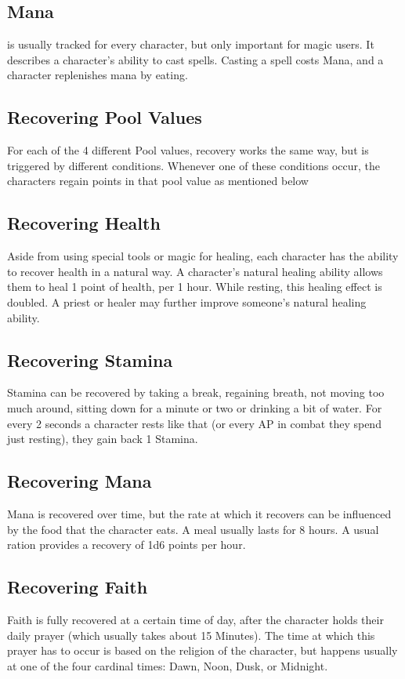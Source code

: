 \subsection{Mana}\label{pool:mana} is usually tracked for every character, but only important for magic users.
It describes a character's ability to cast spells.
Casting a spell costs Mana, and a character replenishes mana by eating.

\subsection{Recovering Pool Values}\label{subsec:recoveringPoolValues}
For each of the 4 different Pool values, recovery works the same way, but is triggered by different conditions.
Whenever one of these conditions occur, the characters regain points in that pool value as mentioned below

\subsection{Recovering Health}\label{subsec:recoverHealth}
Aside from using special tools or magic for healing, each character has the ability to recover health in a natural way.
A character's natural healing ability allows them to heal 1 point of health, per 1 hour.
While resting, this healing effect is doubled.
A priest or healer may further improve someone's natural healing ability.

\subsection{Recovering Stamina}\label{subsec:recoverStamina}
Stamina can be recovered by taking a break, regaining breath, not moving too much around, sitting down for a minute or two or drinking a bit of water.
For every 2 seconds a character rests like that (or every AP in combat they spend just resting), they gain back 1 Stamina.

\subsection{Recovering Mana}\label{subsec:recoverMana}
Mana is recovered over time, but the rate at which it recovers can be influenced by the food that the character eats.
A meal usually lasts for 8 hours.
A usual ration provides a recovery of 1d6 points per hour.

\subsection{Recovering Faith}\label{subsec:recoverFaith}
Faith is fully recovered at a certain time of day, after the character holds their daily prayer (which usually takes about 15 Minutes).
The time at which this prayer has to occur is based on the religion of the character, but happens usually at one of the four cardinal times: Dawn, Noon, Dusk, or Midnight.

